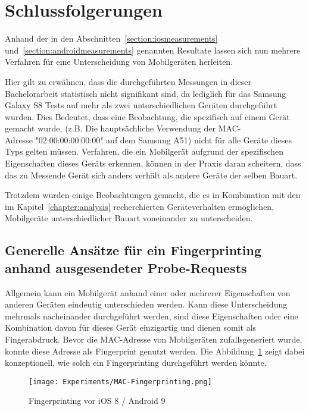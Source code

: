 \section{Schlussfolgerungen
\label{section:conclusions}}
Anhand der in den Abschnitten~\ref{section:iosmeasurements} 
und~\ref{section:androidmeasurements} genannten Resultate lassen sich nun 
mehrere Verfahren für eine Unterscheidung von Mobilgeräten herleiten.

Hier gilt zu erwähnen, dass die durchgeführten Messungen in dieser Bachelorarbeit
statistisch nicht signifikant sind, da lediglich für das Samsung Galaxy S8 
Tests auf mehr als zwei unterschiedlichen Geräten durchgeführt wurden.
Dies Bedeutet, dass eine Beobachtung, die spezifisch auf einem Gerät gemacht 
wurde, (z.B. Die hauptsächliche Verwendung der MAC-\\Adresse "02:00:00:00:00:00" 
auf dem Samsung A51) nicht für alle Geräte dieses Typs gelten müssen.
Verfahren, die ein Mobilgerät aufgrund der spezifischen Eigenschaften dieses 
Geräts erkennen, können in der Praxis daran scheitern, dass das zu Messende
Gerät sich anders verhält als andere Geräte der selben Bauart.

Trotzdem wurden einige Beobachtungen gemacht, die es in Kombination mit den im 
Kapitel~\ref{chapter:analysis} recherchierten Geräteverhalten ermöglichen,
Mobilgeräte unterschiedlicher Bauart voneinander zu unterscheiden.

\clearpage

\subsection{Generelle Ansätze für ein Fingerprinting anhand ausgesendeter Probe-Requests}
Allgemein kann ein Mobilgerät anhand einer oder mehrerer Eigenschaften von 
anderen Geräten eindeutig unterschieden werden. Kann diese Unterscheidung 
mehrmals nacheinander durchgeführt werden, sind diese Eigenschaften oder eine 
Kombination davon für dieses Gerät einzigartig und dienen somit als Fingerabdruck.
Bevor die MAC-Adresse von Mobilgeräten zufallsgeneriert wurde, 
konnte diese Adresse als Fingerprint genutzt werden. 
Die Abbildung~\ref{figure:naivefingerprinting} zeigt dabei konzeptionell, 
wie solch ein Fingerprinting durchgeführt werden könnte.

\begin{figure}[h!]
    \centering
    \texttt{[image: Experiments/MAC-Fingerprinting.png]}
    \caption{Fingerprinting vor iOS 8 / Android 9
    \label{figure:naivefingerprinting}}
\end{figure}

